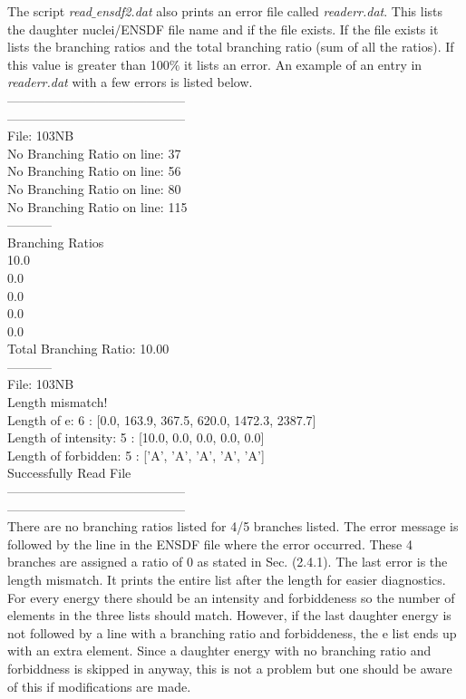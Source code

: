 \documentclass{report}
\begin{document}
The script \textit{read$\_$ensdf2.dat} also prints an error file called \textit{readerr.dat}. This lists the 
daughter nuclei/ENSDF file name and if the file exists. If the file exists it lists the branching ratios and
the total branching ratio (sum of all the ratios). If this value is greater than 100$\%$ it lists an error. An example
 of an entry in \textit{readerr.dat} with a few errors is listed below.\\
------------------------------------------\\
------------------------------------------ \\
File:  103NB \\
No Branching Ratio on line:  37\\
No Branching Ratio on line:  56\\
No Branching Ratio on line:  80\\
No Branching Ratio on line:  115\\
----------- \\
Branching Ratios \\
10.0\\
0.0\\
0.0\\
0.0\\
0.0\\
Total Branching Ratio:  10.00\\
-----------\\
File:  103NB\\
Length mismatch!\\
Length of e:  6 :  [0.0, 163.9, 367.5, 620.0, 1472.3, 2387.7]\\
Length of intensity:  5 :  [10.0, 0.0, 0.0, 0.0, 0.0]\\
Length of forbidden:  5 :  ['A', 'A', 'A', 'A', 'A']\\
Successfully Read File\\
------------------------------------------\\
------------------------------------------\\
There are no branching ratios listed for 4/5 branches listed. The error message is followed by the line
 in the ENSDF file where the error occurred. These 4 branches are assigned a ratio of 0 as stated in Sec. (2.4.1). 
 The last error is the length mismatch. It prints the entire list after the length for easier diagnostics.
  For every energy there should be an intensity and forbiddeness so the
number of elements in the three lists should match. However, if the last daughter energy is not followed 
by a line with a branching ratio and forbiddeness, the e list ends up with an extra element. Since 
a daughter energy with no branching ratio and forbiddness is skipped in anyway, this is not a problem but
one should be aware of this if modifications are made. 
\end{document}
